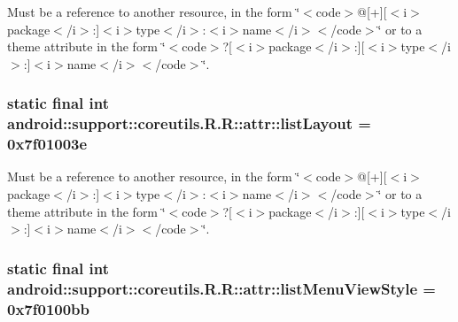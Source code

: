 Must be a reference to another resource, in the form \char`\"{}$<$code$>$@\mbox{[}+\mbox{]}\mbox{[}$<$i$>$package$<$/i$>$:\mbox{]}$<$i$>$type$<$/i$>$:$<$i$>$name$<$/i$>$$<$/code$>$\char`\"{} or to a theme attribute in the form \char`\"{}$<$code$>$?\mbox{[}$<$i$>$package$<$/i$>$:\mbox{]}\mbox{[}$<$i$>$type$<$/i$>$:\mbox{]}$<$i$>$name$<$/i$>$$<$/code$>$\char`\"{}. \hypertarget{classandroid_1_1support_1_1coreutils_1_1_r_1_1attr_747dbdd2f3c2bf105e65c4a1e636e207}{
\subsubsection[{listLayout}]{\setlength{\rightskip}{0pt plus 5cm}static final int android::support::coreutils.R.R::attr::listLayout = 0x7f01003e}}
\label{classandroid_1_1support_1_1coreutils_1_1_r_1_1attr_747dbdd2f3c2bf105e65c4a1e636e207}


Must be a reference to another resource, in the form \char`\"{}$<$code$>$@\mbox{[}+\mbox{]}\mbox{[}$<$i$>$package$<$/i$>$:\mbox{]}$<$i$>$type$<$/i$>$:$<$i$>$name$<$/i$>$$<$/code$>$\char`\"{} or to a theme attribute in the form \char`\"{}$<$code$>$?\mbox{[}$<$i$>$package$<$/i$>$:\mbox{]}\mbox{[}$<$i$>$type$<$/i$>$:\mbox{]}$<$i$>$name$<$/i$>$$<$/code$>$\char`\"{}. \hypertarget{classandroid_1_1support_1_1coreutils_1_1_r_1_1attr_58d34e13ad53b4a2ca4c16ce5cc19644}{
\subsubsection[{listMenuViewStyle}]{\setlength{\rightskip}{0pt plus 5cm}static final int android::support::coreutils.R.R::attr::listMenuViewStyle = 0x7f0100bb}}
\label{classandroid_1_1support_1_1coreutils_1_1_r_1_1attr_58d34e13ad53b4a2ca4c16ce5cc19644}


